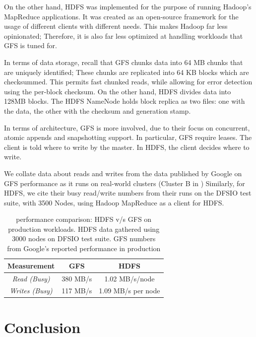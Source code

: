 \documentclass{article}
\begin{document}
On the other hand, HDFS was implemented for the purpose of
running Hadoop’s MapReduce applications. It was created as an open-source
framework for the usage of different clients with different needs. This makes
Hadoop far less opinionated; Therefore, it is also far less optimized at handling
workloads that GFS is tuned for.

In terms of data storage, recall that GFS chunks data into 64 MB chunks that
are uniquely identified; These chunks are replicated into 64 KB blocks
which are checksummed. This permits fast chunked reads, while allowing
for error detection using the per-block checksum. On the other hand, HDFS 
divides data into  128MB blocks. The HDFS NameNode holds block replica
as two files: one with the data, the other with the checksum and generation stamp.

In terms of architecture, GFS is more involved, due to their focus on
concurrent, atomic appends and snapshotting support. In particular, GFS
require leases. The client is told where to write by the master. In HDFS,
the client decides where to write. 


We collate data about reads and writes from the data published by Google
on GFS performance as it runs on real-world clusters (Cluster B in )%
Similarly, for HDFS, we cite their busy read/write numbers from their runs
on the DFSIO test suite, with 3500 Nodes, using Hadoop MapReduce as a client
for HDFS.


\begin{table}[H]
\centering
\begin{tabular}{c c c}
\hline
 \bf Measurement &  \bf GFS &  \bf HDFS \\
 \hline
 \it Read (Busy)  & 380 MB/s &  1.02 MB/s/node \\
 \it Writes (Busy) & 117 MB/s  & 1.09 MB/s per node \\
 \end{tabular}
 \caption{performance comparison: HDFS v/s GFS on production workloads. HDFS data gathered using 3000 nodes on DFSIO
 test suite. GFS numbers from Google's reported performance in production}
\label{tab:hdfsvsgfs}
\end{table}

\section{Conclusion}

\nocite{*} %


\end{document}
